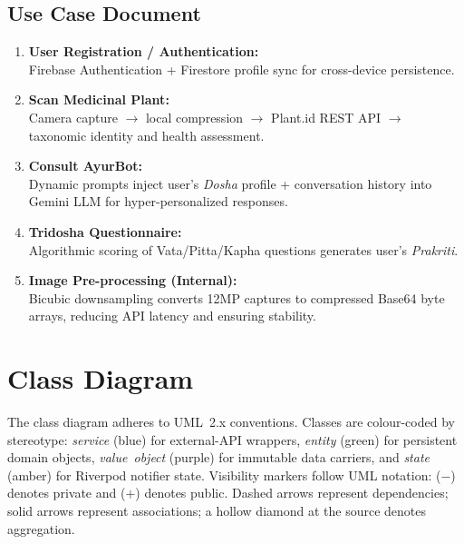 \subsection{Use Case Document}
\begin{enumerate}
    \item \textbf{User Registration / Authentication:}\\
    Firebase Authentication + Firestore profile sync for cross-device persistence.

    \item \textbf{Scan Medicinal Plant:}\\
    Camera capture $\rightarrow$ local compression $\rightarrow$ Plant.id REST API
    $\rightarrow$ taxonomic identity and health assessment.

    \item \textbf{Consult AyurBot:}\\
    Dynamic prompts inject user's \textit{Dosha} profile + conversation history into
    Gemini LLM for hyper-personalized responses.

    \item \textbf{Tridosha Questionnaire:}\\
    Algorithmic scoring of Vata/Pitta/Kapha questions generates user's \textit{Prakriti}.

    \item \textbf{Image Pre-processing (Internal):}\\
    Bicubic downsampling converts 12MP captures to compressed Base64 byte arrays,
    reducing API latency and ensuring stability.
\end{enumerate}

\newpage
\section{Class Diagram}
The class diagram adheres to UML~2.x conventions. Classes are colour-coded by
stereotype: \textit{service} (blue) for external-API wrappers, \textit{entity}
(green) for persistent domain objects, \textit{value~object} (purple) for
immutable data carriers, and \textit{state} (amber) for Riverpod notifier state.
Visibility markers follow UML notation: ($-$) denotes private and
($+$) denotes public. Dashed arrows represent dependencies; solid arrows
represent associations; a hollow diamond at the source denotes aggregation.

